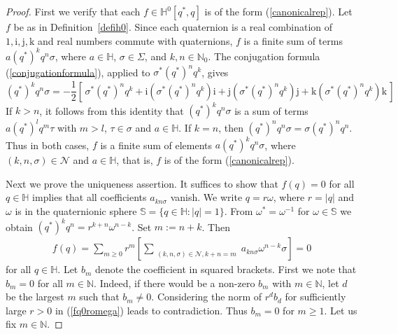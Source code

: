 \documentclass[11pt,a4paper]{amsart}
\theoremstyle{definition}
\begin{document}
\begin{proof}
First we verify that each $f\in \mathbb{H}^{0}[q^{*}, q]$ is of the form
(\ref{canonicalrep}). Let $f$ be as in Definition~\ref{defih0}. Since each
quaternion is a real combination of
$1,\mathrm{i}, \mathrm{j},\mathrm{k}$ and real numbers commute with quaternions,
$f$ is a finite sum of terms $a (q^{*})^{k} q^{n} \sigma $, where
$a\in \mathbb{H}$, $\sigma \in \Sigma $, and $k,n\in \mathbb{N}_{0}$. The
conjugation formula (\ref{conjugationformula}), applied to
$\sigma ^{*} (q^{*})^{n} q^{k}$, gives
%
\begin{equation*}
(q^{*})^{k} q^{n} \sigma = -\frac{1}{2}[\, \sigma ^{*} (q^{*})^{n} q^{k}
+ \mathrm{i}(\sigma ^{*} (q^{*})^{n} q^{k})\mathrm{i}+ \mathrm{j}(
\sigma ^{*} (q^{*})^{n} q^{k})\mathrm{j}+ \mathrm{k}(\sigma ^{*} (q^{*})^{n}
q^{k})\mathrm{k}\, ]
\end{equation*}
%
If $k>n$, it follows from this identity that
$(q^{*})^{k} q^{n} \sigma $ is a sum of terms
$a(q^{*})^{l} q^{m}\tau $ with $m>l$, $\tau \in \sigma $ and
$a\in \mathbb{H}$. If $k=n$, then
$(q^{*})^{n}q^{n}\sigma =\sigma (q^{*})^{n} q^{n}$. Thus in both cases,
$f$ is a finite sum of elements $a (q^{*})^{k} q^{n} \sigma $, where
$(k,n,\sigma )\in \mathcal{N}$ and $a\in \mathbb{H}$, that is, $f$ is of
the form (\ref{canonicalrep}).

Next we prove the uniqueness assertion. It suffices to show that
$f(q)=0$ for all $q\in \mathbb{H}$ implies that all coefficients
$a_{kn\sigma}$ vanish. We write $q=r\omega $, where $r=|q|$ and
$\omega $ is in the quaternionic sphere
$\mathbb{S}=\{q\in \mathbb{H}: |q|=1\}$. From
$\omega ^{*} = \omega ^{-1}$ for $\omega \in \mathbb{S}$ we obtain
$(q^{*})^{k} q^{n} = r^{k+n} \omega ^{n-k}$. Set $m := n + k$. Then
%
\begin{align}
\label{fq0romega}
f(q)=\sum _{m\geq 0} r^{m} \left [\sum _{
\substack{(k,n,\sigma )\in \mathcal{N},k+n=m}} a_{kn\sigma} \omega ^{n-k}
\sigma \right ] =0
\end{align}
%
for all $q\in \mathbb{H}$. Let $b_{m}$ denote the coefficient in squared
brackets. First we note that $b_{m}=0$ for all $m\in \mathbb{N}$. Indeed,
if there would be a non-zero $b_{m}$ with $m\in \mathbb{N}$, let $d$ be
the largest $m$ such that $b_{m}\neq 0$. Considering the norm of
$r^{d}b_{d}$ for sufficiently large $r>0$ in (\ref{fq0romega}) leads to
contradiction. Thus $b_{m}=0$ for $m\geq 1$. Let us fix
$m\in \mathbb{N}$.


\end{proof}
\end{document}
